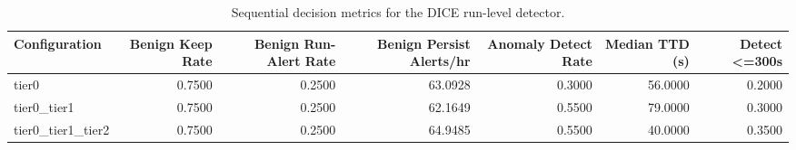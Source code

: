 \begin{table}[t]
\centering
\caption{Sequential decision metrics for the DICE run-level detector.}
\label{tab:dice_sequential_metrics}
\footnotesize
\begin{tabular}{lrrrrrr}
\toprule
Configuration & Benign Keep Rate & Benign Run-Alert Rate & Benign Persist Alerts/hr & Anomaly Detect Rate & Median TTD (s) & Detect <=300s \\
\midrule
tier0 & 0.7500 & 0.2500 & 63.0928 & 0.3000 & 56.0000 & 0.2000 \\
tier0_tier1 & 0.7500 & 0.2500 & 62.1649 & 0.5500 & 79.0000 & 0.3000 \\
tier0_tier1_tier2 & 0.7500 & 0.2500 & 64.9485 & 0.5500 & 40.0000 & 0.3500 \\
\bottomrule
\end{tabular}

\end{table}

